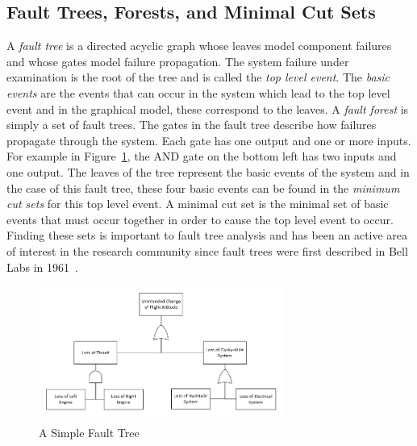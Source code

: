 \subsection{Fault Trees, Forests, and Minimal Cut Sets}
\label{sec:saArtifacts}

A \emph{fault tree} is a directed acyclic graph whose leaves model component failures and whose gates model failure propagation. The system failure under examination is the root of the tree and is called the \emph{top level event}. The \emph{basic events} are the events that can occur in the system which lead to the top level event and in the graphical model, these correspond to the leaves. A {\em fault forest} is simply a set of fault trees. The gates in the fault tree describe how failures propagate through the system. Each gate has one output and one or more inputs. For example in Figure~\ref{fig:introFT}, the AND gate on the bottom left has two inputs and one output. The leaves of the tree represent the basic events of the system and in the case of this fault tree, these four basic events can be found in the \textit{minimum cut sets} for this top level event. A minimal cut set is the minimal set of basic events that must occur together in order to cause the top level event to occur. Finding these sets is important to fault tree analysis and has been an active area of interest in the research community since fault trees were first described in Bell Labs in 1961~\cite{historyFTA, 0f356f05e72f43018211b36f97c8854a}. 

\begin{figure}[h]
\begin{center}
\includegraphics[width=8cm]{images/ft.png}
\caption{A Simple Fault Tree} \label{fig:introFT}
\end{center}
\end{figure}

